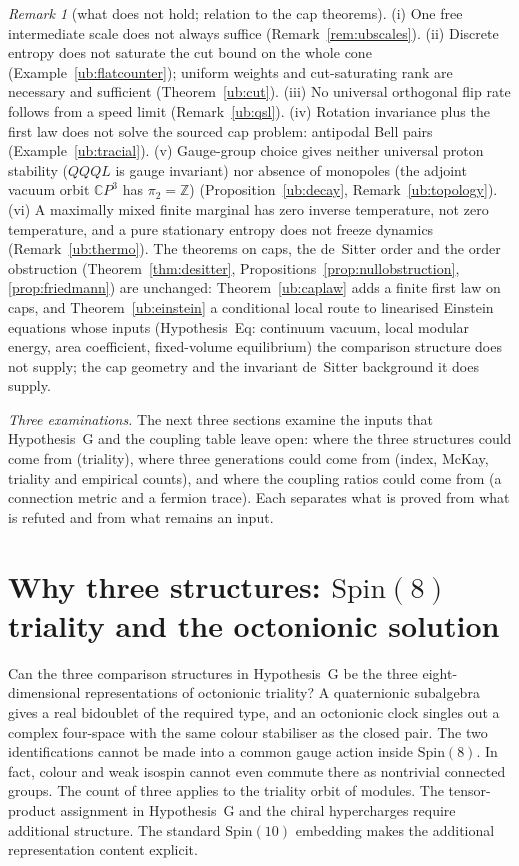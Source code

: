 \documentclass[aps,pra,onecolumn,superscriptaddress,nofootinbib,10pt]{revtex4-2}
\theoremstyle{definition}
\theoremstyle{remark}
\newtheorem{remark}[theorem]{Remark}
\newcommand{\C}{\mathbb{C}}
\newcommand{\Z}{\mathbb{Z}}
\begin{document}
\begin{remark}[what does not hold; relation to the cap theorems]\label{rem:ubnogo}
(i) One free intermediate scale does not always suffice (Remark~\ref{rem:ubscales}).  (ii) Discrete entropy does not
saturate the cut bound on the whole cone (Example~\ref{ub:flatcounter}); uniform weights and cut-saturating rank are
necessary and sufficient (Theorem~\ref{ub:cut}).  (iii) No universal orthogonal flip rate follows from a speed limit
(Remark~\ref{ub:qsl}).  (iv) Rotation invariance plus the first law does not solve the sourced cap problem: antipodal
Bell pairs (Example~\ref{ub:tracial}).  (v) Gauge-group choice gives neither universal proton stability ($QQQL$ is
gauge invariant) nor absence of monopoles (the adjoint vacuum orbit $\C P^3$ has $\pi_2=\Z$) (Proposition~\ref{ub:decay},
Remark~\ref{ub:topology}).  (vi) A maximally mixed finite marginal has zero inverse temperature, not zero
temperature, and a pure stationary entropy does not freeze dynamics (Remark~\ref{ub:thermo}).  The theorems on
caps, the de~Sitter order and the order obstruction (Theorem~\ref{thm:desitter}, Propositions~\ref{prop:nullobstruction},
\ref{prop:friedmann}) are unchanged: Theorem~\ref{ub:caplaw} adds a finite first law on caps, and
Theorem~\ref{ub:einstein} a conditional local route to linearised Einstein equations whose inputs (Hypothesis~Eq:
continuum vacuum, local modular energy, area coefficient, fixed-volume equilibrium) the comparison structure
does not supply; the cap geometry and the invariant de~Sitter background it does supply.
\end{remark}

\smallskip\noindent\emph{Three examinations.}  The next three sections examine the inputs that Hypothesis~G and
the coupling table leave open: where the three structures could come from (triality), where three
generations could come from (index, McKay, triality and empirical counts), and where the coupling ratios
could come from (a connection metric and a fermion trace).  Each separates what is proved from what is
refuted and from what remains an input.

\section{Why three structures: $\mathrm{Spin}(8)$ triality and the octonionic solution}\label{sec:triality}

Can the three comparison structures in Hypothesis~G be the three
eight-dimensional representations of octonionic triality? A quaternionic
subalgebra gives a real bidoublet of the required type, and an octonionic
clock singles out a complex four-space with the same colour stabiliser as
the closed pair. The two identifications cannot be made into a common gauge
action inside \(\mathrm{Spin}(8)\). In fact, colour and weak isospin
cannot even commute there as nontrivial connected groups. The count of
three applies to the triality orbit of modules. The tensor-product
assignment in Hypothesis~G and the chiral hypercharges require additional
structure. The standard \(\mathrm{Spin}(10)\) embedding makes the
additional representation content explicit.
\end{document}
